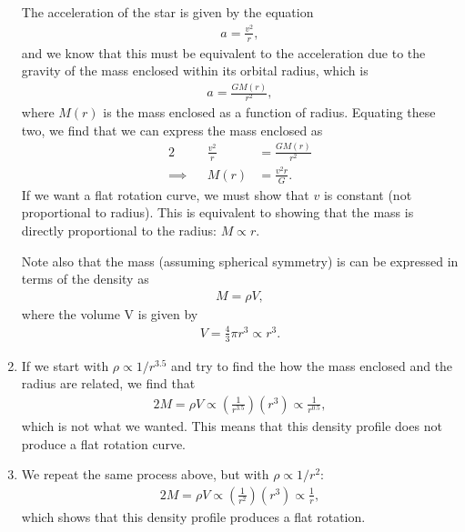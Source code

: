 \documentclass[11pt,letterpaper]{article}
\begin{document}
\begin{enumerate}[label=(\alph*)]
        The acceleration of the star is given by the equation 
        \begin{align*}
            a = \frac{v^2}{r},
        \end{align*}
        and we know that this must be equivalent to the acceleration due to the gravity of the mass enclosed within its orbital radius, which is 
        \begin{align*}
            a = \frac{GM(r)}{r^2},
        \end{align*}
        where $M(r)$ is the mass enclosed as a function of radius.
        Equating these two, we find that we can express the mass enclosed as 
        \begin{alignat*}{2}
            &&\frac{v^2}{r} &= \frac{GM(r)}{r^2} \\
            \implies&&M(r) &= \frac{v^2r}{G}.
        \end{alignat*}
        If we want a flat rotation curve, we must show that $v$ is constant (not proportional to radius). This is equivalent to showing that the mass is directly proportional to the radius: $M \propto r$. 

        Note also that the mass (assuming spherical symmetry) is can be expressed in terms of the density as 
        \begin{align*}
            M = \rho V,
        \end{align*}
        where the volume V is given by 
        \begin{align*}
            V = \frac{4}{3}\pi r^3 \propto r^3.
        \end{align*}
    \item If we start with $\rho \propto 1/r^{3.5}$ and try to find the how the mass enclosed and the radius are related, we find that 
        \begin{align*}{2}
            M = \rho V \propto (\frac{1}{r^{3.5}}) (r^{3}) \propto \frac{1}{r^{0.5}},
        \end{align*}
        which is not what we wanted. This means that this density profile does not produce a flat rotation curve. 
    \item We repeat the same process above, but with $\rho \propto 1/r^{2}$:
        \begin{align*}{2}
            M = \rho V \propto (\frac{1}{r^{2}}) (r^{3}) \propto \frac{1}{r},
        \end{align*}
        which shows that this density profile produces a flat rotation.
\end{enumerate}
\end{document}
